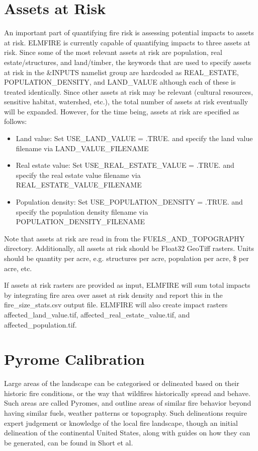 \section{Assets at Risk}
\label{assets_at_risk}

An important part of quantifying fire risk is assessing potential impacts to assets at risk. ELMFIRE is currently capable of quantifying impacts to three assets at risk. Since some of the most relevant assets at risk are population, real estate/structures, and land/timber, the keywords that are used to specify assets at risk in the \&INPUTS namelist group are hardcoded as REAL\_ESTATE, POPULATION\_DENSITY, and LAND\_VALUE although each of these is treated identically. Since other assets at risk may be relevant (cultural resources, sensitive habitat, watershed, etc.), the total number of assets at risk eventually will be expanded. However, for the time being, assets at risk are specified as follows:

\begin{itemize}
    \item Land value: Set USE\_LAND\_VALUE = .TRUE. and specify the land value filename via LAND\_VALUE\_FILENAME
    \item Real estate value: Set USE\_REAL\_ESTATE\_VALUE = .TRUE. and specify the real estate value filename via REAL\_ESTATE\_VALUE\_FILENAME
    \item Population density: Set USE\_POPULATION\_DENSITY = .TRUE. and specify the population density filename via POPULATION\_DENSITY\_FILENAME
\end{itemize}

Note that assets at risk are read in from the FUELS\_AND\_TOPOGRAPHY directory. Additionally, all assets at risk should be Float32 GeoTiff rasters. Units should be quantity per acre, e.g. structures per acre, population per acre, \$ per acre, etc.

If assets at risk rasters are provided as input, ELMFIRE will sum total impacts by integrating fire area over asset at risk density and report this in the fire\_size\_stats.csv output file. ELMFIRE will also create impact rasters affected\_land\_value.tif, affected\_real\_estate\_value.tif, and affected\_population.tif.

\section{Pyrome Calibration}
\label{calibration}

Large areas of the landscape can be categorised or delineated based on their historic fire conditions, or the way that wildfires historically spread and behave. Such areas are called Pyromes, and outline areas of similar fire behavior beyond having similar fuels, weather patterns or topography. Such delineations require expert judgement or knowledge of the local fire landscape, though an initial delineation of the continental United States, along with guides on how they can be generated, can be found in Short et al. 

